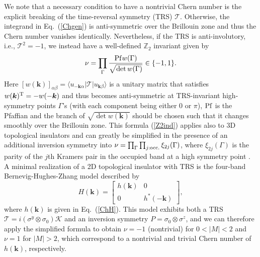 \documentclass{tADP2e}
\theoremstyle{plain}
\theoremstyle{plain}
\theoremstyle{definition}
\begin{document}
We note that a necessary condition to have a nontrivial Chern number is the explicit breaking of the time-reversal symmetry (TRS) $\mathcal{T}$. Otherwise, the integrand in Eq.~(\ref{Chgen}) is anti-symmetric over the Brillouin zone and thus the Chern number vanishes identically. Nevertheless, if the TRS is anti-involutory, i.e., $\mathcal{T}^2=-1$, we instead have a well-defined $\mathbb{Z}_2$ invariant given by \cite{KCL05,FL06}
\begin{equation}
\nu=\prod_{\Gamma}\frac{{\rm Pf} w(\Gamma)}{\sqrt{\det w(\Gamma)}}\in\{-1,1\}.
\label{Z2ind}
\end{equation}
Here $[w(\boldsymbol{k})]_{\alpha\beta}=\langle u_{-\boldsymbol{k}\alpha}|\mathcal{T}|u_{\boldsymbol{k}\beta}\rangle$ is a unitary matrix that satisfies $w(\boldsymbol{k})^{\rm T}=-w(-\boldsymbol{k})$ and thus becomes anti-symmetric at TRS-invariant high-symmetry points $\Gamma$'s (with each component being either $0$ or $\pi$), ${\rm Pf}$ is the Pfaffian and the branch of $\sqrt{\det w(\boldsymbol{k})}$ should be chosen such that it changes smoothly over the Brillouin zone. This formula (\ref{Z2ind}) applies also to 3D topological insulators \cite{FL07} and can greatly be simplified in the presence of an additional inversion symmetry into 
$\nu=\prod_{\Gamma}\prod_{j:{\rm occ.}}\xi_{2j}(\Gamma)$,
where $\xi_{2j}(\Gamma)$ is the parity of the $j$th Kramers pair in the occupied band at a high symmetry point \cite{FL07b}. A minimal realization of a 2D topological insulator with TRS is the four-band Bernevig-Hughes-Zhang model described by \cite{BBA06}
\begin{equation}\label{bhzhermitian}
H(\boldsymbol{k})=\begin{bmatrix} h(\boldsymbol{k}) & 0 \\ 0 & h^*(-\boldsymbol{k}) \end{bmatrix},
\end{equation}
where $h(\boldsymbol{k})$ is given in Eq.~(\ref{ChH}). This model exhibits both a TRS $\mathcal{T}=i(\sigma^y\otimes\sigma_0)\mathcal{K}$ and an inversion symmetry $P=\sigma_0\otimes\sigma^z$, and we can therefore apply the simplified formula 
to obtain $\nu=-1$ (nontrivial) for $0<|M|<2$ and $\nu=1$ for $|M|>2$, which correspond to a nontrivial and trivial Chern number of $h(\boldsymbol{k})$, respectively.
\end{document}
